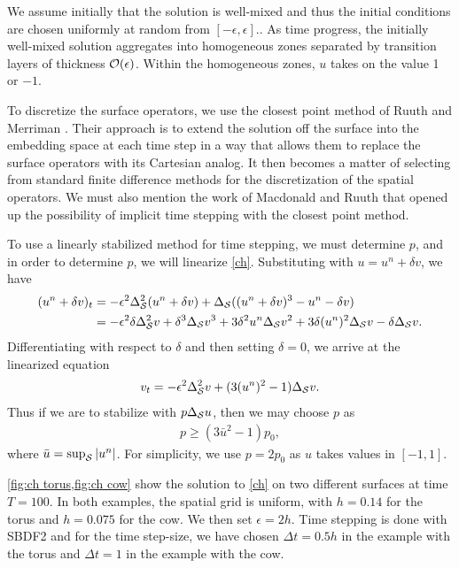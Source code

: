 We assume initially that the solution is well-mixed and thus the initial conditions are chosen uniformly at random from $[-\epsilon,\epsilon]$.. As time progress, the initially well-mixed solution aggregates into homogeneous zones separated by transition layers of thickness $\O(\epsilon)$. Within the homogeneous zones, $u$ takes on the value 1 or $-1$. 

To discretize the surface operators, we use the closest point method of Ruuth and Merriman \cite{ruuth2008simple}. Their approach is to extend the solution off the surface into the embedding space at each time step in a way that allows them to replace the surface operators with its Cartesian analog. It then becomes a matter of selecting from standard finite difference methods for the discretization of the spatial operators. We must also mention the work of Macdonald and Ruuth \cite{macdonald2009implicit} that opened up the possibility of implicit time stepping with the closest point method.

To use a linearly stabilized method for time stepping, we must determine $p$, and in order to determine $p$, we will linearize \cref{ch}. Substituting with $u = u^n + \delta v$, we have 
\begin{align}
\begin{split} 
(u^n + \delta v)_t 
&= -\epsilon^2\Delta_\S^2 (u^n + \delta v) 
+ \Delta_\S((u^n + \delta v)^3 - u^n - \delta v) 
\\
&= -\epsilon^2\delta\Delta_\S^2 v
+ \delta^3\Delta_\S v^3 + 3\delta^2u^n \Delta_\S v^2 + 3\delta (u^n)^2 \Delta_\S v - \delta \Delta_\S v. 
\end{split} 
\label{ch linearize}
\end{align}
Differentiating with respect to $\delta$ and then setting $\delta = 0$, we arrive at the linearized equation 
\begin{align}
v_t = -\epsilon^2\Delta_\S^2 v + (3(u^n)^2-1) \Delta_\S v. 
\end{align}
Thus if we are to stabilize with $p\Delta_\S u$, then we may choose $p$ as 
\begin{align}
p \geq (3\bar u^2 - 1)p_0, 
\end{align}
where $\bar u = \sup_\S \abs{u^n}$. For simplicity, we use $p=2p_0$ as $u$ takes values in $[-1,1]$.  

\cref{fig:ch torus,fig:ch cow} show the solution to \cref{ch} on two different surfaces at time $T=100$. In both examples, the spatial grid is uniform, with $h=0.14$ for the torus and $h=0.075$ for the cow. We then set $\epsilon=2h$. Time stepping is done with SBDF2 and for the time step-size, we have chosen $\Delta t = 0.5h$ in the example with the torus and $\Delta t = 1$ in the example with the cow. 

